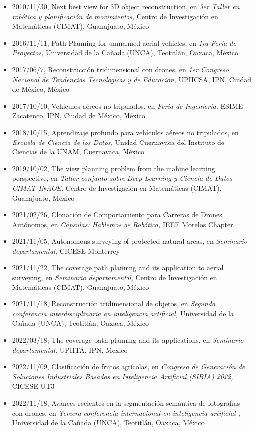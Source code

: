 \begin{itemize} 
\item 2010/11/30, Next best view for 3D object reconstruction, en \textit{ 3er Taller en robótica y planificación de movimientos,} Centro de Investigación en Matemáticas (CIMAT), Guanajuato, México 
\item 2016/11/11, Path Planning for unmanned aerial vehicles, en \textit{ 1ra Feria de Proyectos,} Universidad de la Cañada (UNCA), Teotitlán, Oaxaca, México 
\item 2017/06/7, Reconstrucción tridimensional con drones, en \textit{ 1er Congreso Nacional de Tendencias Tecnológicas y de Educación,} UPIICSA, IPN, Ciudad de México, México 
\item 2017/10/10, Vehiculos aéreos no tripulados, en \textit{ Feria de Ingeniería,} ESIME Zacatenco, IPN, Ciudad de México, México 
\item 2018/10/15, Aprendizaje profundo para vehículos aéreos no tripulados, en \textit{ Escuela de Ciencia de los Datos,} Unidad Cuernavaca del Instituto de Ciencias de la UNAM, Cuernavaca, México 
\item 2019/10/02, The view planning problem from the mahine learning perspective, en \textit{ Taller conjunto sobre Deep Learning y Ciencia de Datos CIMAT-INAOE,} Centro de Investigación en Matemáticas (CIMAT), Guanajuato, México 
\item 2021/02/26, Clonación de Comportamiento para Carreras de Drones Autónomos, en \textit{ Cápsulas: Hablemos de Robótica,} IEEE Morelos Chapter 
\item 2021/11/05, Autonomous surveying of protected natural areas, en \textit{ Seminario departamental,} CICESE Monterrey 
\item 2021/11/22, The coverage path planning and its application to aerial surveying, en \textit{ Seminario departamental,} Centro de Investigación en Matemáticas (CIMAT), Guanajuato, México 
\item 2021/11/18, Reconstrucción tridimensional de objetos, en \textit{ Segunda conferencia interdisciplinaria en inteligencia artificial,} Universidad de la Cañada (UNCA), Teotitlán, Oaxaca, México 
\item 2022/03/18, The coverage path planning and its applications, en \textit{ Seminario departamental,} UPIITA, IPN, Mexico 
\item 2022/11/09, Clasificación de frutos agrícolas, en \textit{ Congreso de Generación de Soluciones Industriales Basados en Inteligencia Artificial (SIBIA) 2022,} CICESE UT3 
\item 2022/11/18, Avances recientes en la segmentación semántica de fotografías con drones, en \textit{ Tercera conferencia internacional en inteligencia artificial ,} Universidad de la Cañada (UNCA), Teotitlán, Oaxaca, México 

\end{itemize}
